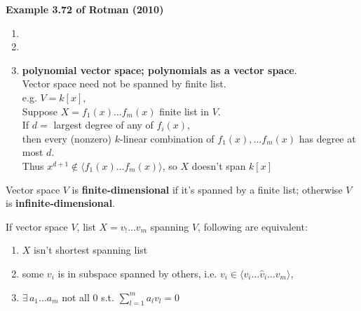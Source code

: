 \textbf{Example 3.72 of Rotman (2010) \cite{agat:JRotman2010}}
\begin{enumerate}
	\item[(i)]
	\item[(ii)]
	\item[(iii)] \textbf{polynomial vector space; polynomials as a vector space}.  \\
	Vector space need not be spanned by finite list. \\
	e.g. $V=k[x]$, \\
	Suppose $X= f_1(x) \dots f_m(x)$ finite list in $V$. \\
	If $d= $ largest degree of any of $f_i(x)$, \\
	then every (nonzero) $k$-linear combination of $f_1(x), \dots f_m(x)$ has degree at most $d$. \\
	Thus $x^{d+1} \notin \langle f_1(x) \dots f_m(x) \rangle$, so $X$ doesn't span $k[x]$
\end{enumerate}

\begin{definition}
	Vector space $V$ is \textbf{finite-dimensional} if it's spanned by a finite list; otherwise $V$ is \textbf{infinite-dimensional}.
\end{definition}

\begin{proposition}
If vector space $V$, list $X=v_! \dots v_m$ spanning $V$, following are equivalent:
	\begin{enumerate}
		\item[(i)] $X$ isn't shortest spanning list 
		\item[(ii)] some $v_i$ is in subspace spanned by others, i.e. $v_i \in \langle v_i \dots \widehat{v}_i \dots v_m \rangle$, 
		\item[(iii)]		$\exists \, a_1 \dots a_m$ not all $0$ s.t. $\sum_{l=1}^m a_l v_l = 0$
	\end{enumerate}
\end{proposition}

